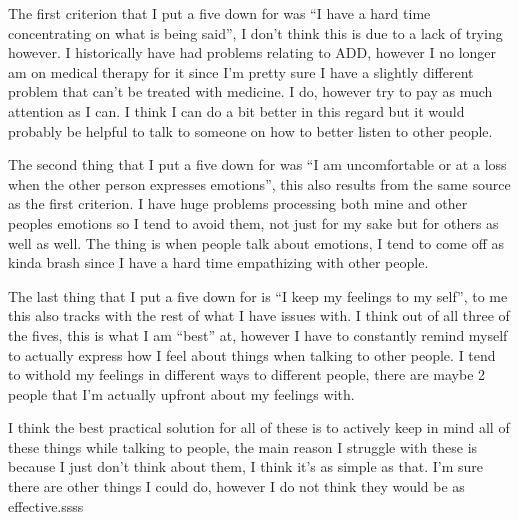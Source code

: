 \documentclass[12pt]{article}
\begin{document}
\begin{doublespace}
\vspace*{20pt}
 
    \par %
    The first criterion that I put a five down for was ``I have a hard time concentrating on what is being said'', I don't think this is due to a lack of trying however. I historically have had problems relating to ADD, however I no longer am on medical therapy for it since I'm pretty sure I have a slightly different problem that can't be treated with medicine. I do, however try to pay as much attention as I can. I think I can do a bit better in this regard but it would probably be helpful to talk to someone on how to better listen to other people.
    \par %
    The second thing that I put a five down for was ``I am uncomfortable or at a loss when the other person expresses emotions'', this also results from the same source as the first criterion. I have huge problems processing both mine and other peoples emotions so I tend to avoid them, not just for my sake but for others as well as well. The thing is when people talk about emotions, I tend to come off as kinda brash since I have a hard time empathizing with other people.
    \par %
    The last thing that I put a five down for is ``I keep my feelings to my self'', to me this also tracks with the rest of what I have issues with. I think out of all three of the fives, this is what I am ``best'' at, however I have to constantly remind myself to actually express how I feel about things when talking to other people. I tend to withold my feelings in different ways to different people, there are maybe 2 people that I'm actually upfront about my feelings with.
    \par %
    I think the best practical solution for all of these is to actively keep in mind all of these things while talking to people, the main reason I struggle with these is because I just don't think about them, I think it's as simple as that. I'm sure there are other things I could do, however I do not think they would be as effective.ssss
\end{doublespace}
\end{document}
